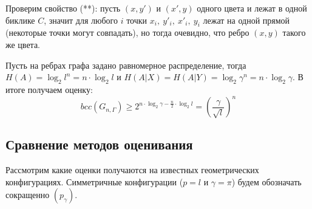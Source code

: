 \documentclass[a4paper]{article}
\begin{document}
\begin{itemize}[noitemsep]
     Проверим свойство (**): пусть $(x, y')$ и $(x', y)$ одного цвета и лежат в одной биклике $C$, значит 
     для любого $i$ точки $x_i,\ y'_i,\ x'_i,\ y_i$ лежат на одной прямой (некоторые точки могут совпадать), 
     но тогда очевидно, что ребро $(x, y)$ такого же цвета. 
     
     Пусть на ребрах графа задано равномерное распределение, тогда $H(A) = \log_2l^n = n\cdot\log_2l$ и 
     $H(A|X)=H(A|Y) = \log_2\gamma^n = n\cdot\log_2\gamma$. В итоге получаем оценку: $$bcc(G_{n, \Gamma}) \geq 
     2^{n\cdot\log_2\gamma - \frac{n}{2}\cdot\log_2l} = \left(\frac{\gamma}{\sqrt{l}}\right)^n$$
     
\end{itemize}

\subsection{Сравнение методов оценивания}

Рассмотрим какие оценки получаются на известных геометрических конфигурациях. Симметричные конфигурации ($p = l$ и 
$\gamma = \pi$) будем обозначать сокращенно $(p_{\gamma})$.
\newpage
\end{document}
